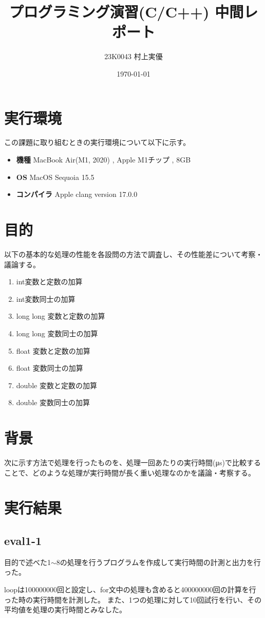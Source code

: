 \documentclass [11pt,a4paper,dvipdfmx]{ujarticle}
\title{プログラミング演習(C/C++) 中間レポート}
\author{23K0043 村上実優}
\date{\today}
\begin{document}
\maketitle
\newpage
\section*{実行環境}
この課題に取り組むときの実行環境について以下に示す。
\begin{itemize}
  \item \textbf{機種} MacBook Air(M1, 2020) ,  Apple M1チップ , 8GB
  \item \textbf{OS} MacOS Sequoia 15.5
  \item \textbf{コンパイラ} Apple clang version 17.0.0
\end{itemize}
\section{目的}
以下の基本的な処理の性能を各設問の方法で調査し、その性能差について考察・議論する。
\begin{enumerate}
  \item int変数と定数の加算
  \item int変数同士の加算
  \item long long 変数と定数の加算
  \item long long 変数同士の加算
  \item float 変数と定数の加算
  \item float 変数同士の加算
  \item double 変数と定数の加算
  \item double 変数同士の加算
\end{enumerate}

\section{背景}
次に示す方法で処理を行ったものを、処理一回あたりの実行時間(μs)で比較することで、どのような処理が実行時間が長く重い処理なのかを議論・考察する。
\clearpage
\section{実行結果}
\subsection{eval1-1}
目的で述べた1$\sim$8の処理を行うプログラムを作成して実行時間の計測と出力を行った。

loopは100000000回と設定し、for文中の処理も含めると400000000回の計算を行った時の実行時間を計測した。
また、1つの処理に対して10回試行を行い、その平均値を処理の実行時間とみなした。
\end{document}
